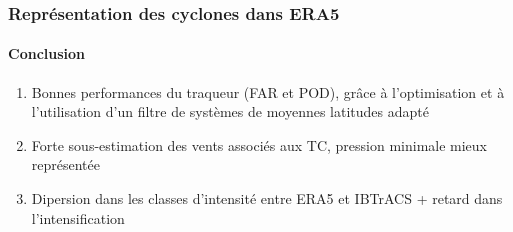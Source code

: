 \documentclass[aspectratio=169, usepdftitle=false, xcolor={dvipsnames}, 9pt,table]{beamer}
\begin{document}
\begin{frame}[c]
    \frametitle{Représentation des cyclones dans ERA5}
    \framesubtitle{Conclusion}
    \begin{block}
        \small
        \begin{enumerate}
            \setlength\itemsep{1em}
            \item<1-> \alert{Bonnes performances} du traqueur (FAR et POD), grâce à l'optimisation et à l'utilisation d'un filtre de systèmes de
                moyennes latitudes adapté
            \item<2-> Forte \alert{sous-estimation} des vents associés aux TC, pression minimale mieux représentée
            \item<3-> \alert{Dipersion} dans les classes d'intensité entre ERA5 et IBTrACS + \alert{retard} dans l'intensification
        \end{enumerate}
        \vspace{1em}
    \end{block}
\end{frame}

\end{document}
